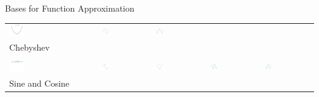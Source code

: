 \documentclass[10pt,compress,xcolor={usenames,dvipsnames},aspectratio=169]{beamer}
\begin{document}
\begin{frame}{Bases for Function Approximation}
\begin{tabular}{>{\centering}m{}>{\centering}m{}>{\centering}m{}>{\centering}m{}>{\centering}m{}}
\includegraphics[width =0.18\textwidth]{ProgramsImages/Chebyshev_Degree_2_1D_k.png}  &
\includegraphics[width =0.18\textwidth]{ProgramsImages/Chebyshev_Degree_3_1D_k.png}  &
\includegraphics[width =0.18\textwidth]{ProgramsImages/Chebyshev_Degree_4_1D_k.png} 
\tabularnewline[-7ex]
Chebyshev
\tabularnewline
\tabularnewline[3ex]
		\includegraphics[width =0.18\textwidth]{ProgramsImages/Chebyshev_Degree_0_1D_k.png}  &
\includegraphics[width =0.18\textwidth]{ProgramsImages/CosineSine_Degree_1_1D_k.png}  &
\includegraphics[width =0.18\textwidth]{ProgramsImages/CosineSine_Degree_2_1D_k.png}  &
\includegraphics[width =0.18\textwidth]{ProgramsImages/CosineSine_Degree_3_1D_k.png}  &
\includegraphics[width =0.18\textwidth]{ProgramsImages/CosineSine_Degree_4_1D_k.png} 
\tabularnewline[-7ex]
Sine and Cosine \tabularnewline
	\end{tabular}
\end{frame}
\end{document}
